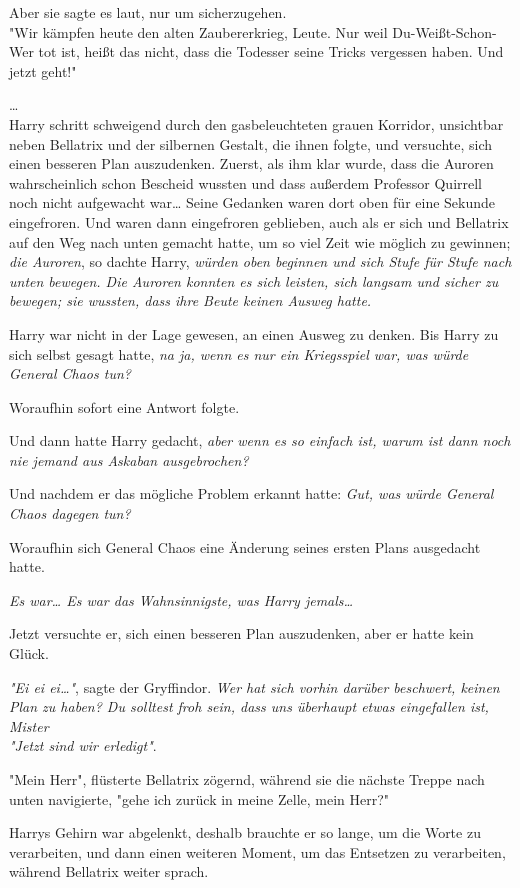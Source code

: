 {Aber sie sagte es laut, nur um sicherzugehen.\\ "Wir kämpfen heute den alten Zaubererkrieg, Leute. Nur weil Du-Weißt-Schon-Wer tot ist, heißt das nicht, dass die Todesser seine Tricks vergessen haben. Und jetzt geht!"

…\\ Harry schritt schweigend durch den gasbeleuchteten grauen Korridor, unsichtbar neben Bellatrix und der silbernen Gestalt, die ihnen folgte, und versuchte, sich einen besseren Plan auszudenken. Zuerst, als ihm klar wurde, dass die Auroren wahrscheinlich schon Bescheid wussten und dass außerdem Professor Quirrell noch nicht aufgewacht war… Seine Gedanken waren dort oben für eine Sekunde eingefroren. Und waren dann eingefroren geblieben, auch als er sich und Bellatrix auf den Weg nach unten gemacht hatte, um so viel Zeit wie möglich zu gewinnen; \emph{die Auroren}, so dachte Harry, \emph{würden oben beginnen und sich Stufe für Stufe nach unten bewegen. Die Auroren konnten es sich leisten, sich langsam und sicher zu bewegen; sie wussten, dass ihre Beute keinen Ausweg hatte.}

Harry war nicht in der Lage gewesen, an einen Ausweg zu denken. Bis Harry zu sich selbst gesagt hatte, \emph{na ja, wenn es nur ein Kriegsspiel war, was würde General Chaos tun?}

Woraufhin sofort eine Antwort folgte.

Und dann hatte Harry gedacht, \emph{aber wenn es so einfach ist, warum ist dann noch nie jemand aus Askaban ausgebrochen?}

Und nachdem er das mögliche Problem erkannt hatte: \emph{Gut, was würde General Chaos dagegen tun?}

Woraufhin sich General Chaos eine Änderung seines ersten Plans ausgedacht hatte.

\emph{Es war… Es war das Wahnsinnigste, was Harry jemals…}

Jetzt versuchte er, sich einen besseren Plan auszudenken, aber er hatte kein Glück.

\emph{"Ei ei ei…"}, sagte der Gryffindor. \emph{Wer hat sich vorhin darüber beschwert, keinen Plan zu haben? Du solltest froh sein, dass uns überhaupt etwas eingefallen ist, Mister\\ "Jetzt sind wir erledigt"}.

"Mein Herr", flüsterte Bellatrix zögernd, während sie die nächste Treppe nach unten navigierte, "gehe ich zurück in meine Zelle, mein Herr?"

Harrys Gehirn war abgelenkt, deshalb brauchte er so lange, um die Worte zu verarbeiten, und dann einen weiteren Moment, um das Entsetzen zu verarbeiten, während Bellatrix weiter sprach.

}
